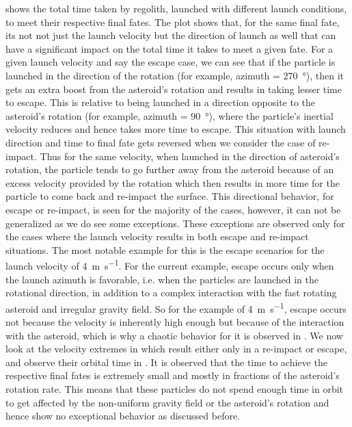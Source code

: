 \FloatBarrier
 shows the total time taken by regolith, launched with different launch conditions, to meet their respective final fates. The plot shows that, for the same final fate, its not not just the launch velocity but the direction of launch as well that can have a significant impact on the total time it takes to meet a given fate. For a given launch velocity and say the escape case, we can see that if the particle is launched in the direction of the rotation (for example, azimuth = \SI{270}{\degree}), then it gets an extra boost from the asteroid's rotation and results in taking lesser time to escape. This is relative to being launched in a direction opposite to the asteroid's rotation (for example, azimuth = \SI{90}{\degree}), where the particle's inertial velocity reduces and hence takes more time to escape.
%
\newline\newline
%
This situation with launch direction and time to final fate gets reversed when we consider the case of re-impact. Thus for the same velocity, when launched in the direction of asteroid's rotation, the particle tends to go further away from the asteroid because of an excess velocity provided by the rotation which then results in more time for the particle to come back and re-impact the surface. This directional behavior, for escape or re-impact, is seen for the majority of the cases, however, it can not be generalized as we do see some exceptions. These exceptions are observed only for the cases where the launch velocity results in both escape and re-impact situations. The most notable example for this is the escape scenarios for the launch velocity of \SI{4}{\metre \per \second}. For the current example, escape occurs only when the launch azimuth is favorable, i.e. when the particles are launched in the rotational direction, in addition to a complex interaction with the fast rotating asteroid and irregular gravity field. So for the example of \SI{4}{\metre \per \second}, escape occurs not because the velocity is inherently high enough but because of the interaction with the asteroid, which is why a chaotic behavior for it is observed in .
%
\newline\newline
%
We now look at the velocity extremes in  which result either only in a re-impact or escape, and observe their orbital time in . It is observed that the time to achieve the respective final fates is extremely small and mostly in fractions of the asteroid's rotation rate. This means that these particles do not spend enough time in orbit to get affected by the non-uniform gravity field or the asteroid's rotation and hence show no exceptional behavior as discussed before.

